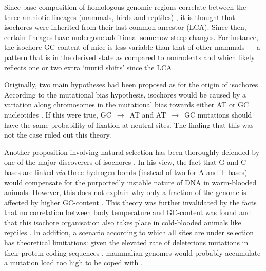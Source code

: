 Since base composition of homologous genomic regions correlate between the three amniotic lineages (mammals, birds and reptiles) \citep{kadi1993compositional,caccio1994singlecopy,hughes1999warmblooded}, it is thought that isochores were inherited from their last common ancestor (LCA).
Since then, certain lineages have undergone additional somehow steep changes.
For instance, the isochore GC-content of mice is less variable than that of other mammals — a pattern that is in the derived state as compared to nonrodents \citep{galtier1998isochore} and which likely reflects one \citep{mouchiroud1988compositional} or two \citep{smith2002compositional} extra ‘murid shifts’ since the LCA\@.

Originally, two main hypotheses had been proposed as for the origin of isochores \citep[reviewed in][]{duret2009biased}.
According to the mutational bias hypothesis, isochores would be caused by a variation along chromosomes in the mutational bias towards either AT or GC nucleotides \citep{filipski1988why,wolfe1989mutation,francino1999isochores,fryxell2000cytosine}.
If this were true, GC~$\rightarrow$~AT and AT~$\rightarrow$~GC mutations should have the same probability of fixation at neutral sites.
The finding that this was not the case \citep{eyre-walker1999evidence, smith2001synonymous, lercher2002evolution, webster2004fixation, spencer2006influence} ruled out this theory.

Another proposition involving natural selection has been thoroughly defended by one of the major discoverers of isochores \citep{bernardi2000isochores,bernardi2007neoselectionist,bernardi2012genome}. 
In his view, the fact that G and C bases are linked \textit{via} three hydrogen bonds (instead of two for A and T bases) would compensate for the purportedly instable nature of DNA in warm-blooded animals.
However, this does not explain why only a fraction of the genome is affected by higher GC-content \citep{duret2009biased}.
This theory was further invalidated by the facts that no correlation between body temperature and GC-content was found \citep{belle2002analysis,ream2003base} and that this isochore organisation also takes place in cold-blooded animals like reptiles \citep{hughes1999warmblooded,hamada2003presence,costantini2016anolis}.
In addition, a scenario according to which all sites are under selection has theoretical limitations: given the elevated rate of deleterious mutations in their protein-coding sequences \citep{eyre-walker1999high,keightley2000deleterious}, mammalian genomes would probably accumulate a mutation load too high to be coped with \citep{eyre-walker2001evolution}.


